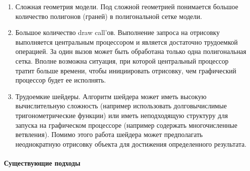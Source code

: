 \begin{enumerate}
    \item {
        Сложная геометрия модели. Под сложной геометрией понимается
        большое количество полигонов (граней) в полигональной сетке модели.
    }
    \item {
        Большое количество draw call'ов.
        Выполнение запроса на отрисовку выполняется центральным процессором и
        является достаточно трудоемкой операцией. За один вызов может быть
        обработана только одна полигональная сетка.
        Вполне возможна ситуация, при которой центральный процессор тратит больше времени,
        чтобы инициировать отрисовку, чем графический процессор будет ее исполнять.
    }
    \item {
        Трудоемкие шейдеры. Алгоритм шейдера может иметь
        высокую вычислительную сложность
        (например использовать долговычислимые тригонометрические функции) или
        иметь неподходящую структуру для запуска на графическом процессоре
        (например содержать многочисленные ветвления).
        Помимо этого работа шейдера может предполагать неоднократную
        отрисовку объекта для достижения определенного результата.
    }
\end{enumerate}

\paragraph{Существующие подходы}


